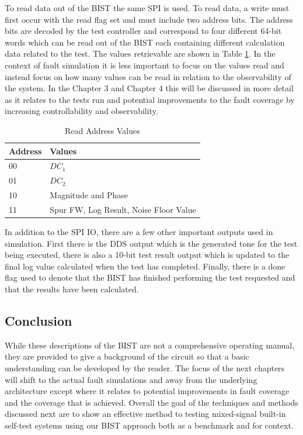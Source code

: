 \documentclass[12pt]{report}
\begin{document}
To read data out of the BIST the same SPI is used.  To read data, a write must first occur with the read flag set and must include two address bits.  The address bits are decoded by the test controller and correspond to four different 64-bit words which can be read out of the BIST each containing different calculation data related to the test.  The values retrievable are shown in Table \ref{tbl:readvals}.  In the context of fault simulation it is less important to focus on the values read and instead focus on how many values can be read in relation to the observability of the system.  In the Chapter 3 and Chapter 4 this will be discussed in more detail as it relates to the tests run and potential improvements to the fault coverage by increasing controllability and observability.  
\begin{table}
	\caption{Read Address Values}
	\begin{center}
		\begin{tabular}{|l|l|}
			\hline
			Address & Values \\ \hline
			00 & $DC_1$ \\ \hline
			01 & $DC_2$ \\ \hline
			10 & Magnitude and Phase \\ \hline
			11 & Spur FW, Log Result, Noise Floor Value \\ \hline			
		\end{tabular}
	\end{center}
	\label{tbl:readvals}
\end{table}

In addition to the SPI IO, there are a few other important outputs used in simulation.  First there is the DDS output which is the generated tone for the test being executed, there is also a 10-bit test result output which is updated to the final log value calculated when the test has completed.  Finally, there is a done flag used to denote that the BIST has finished performing the test requested and that the results have been calculated.  

\subsection{Conclusion}
While these descriptions of the BIST are not a comprehensive operating manual, they are provided to give a background of the circuit so that a basic understanding can be developed by the reader.  The focus of the next chapters will shift to the actual fault simulations and away from the underlying architecture except where it relates to potential improvements in fault coverage and the coverage that is achieved.  Overall the goal of the techniques and methods discussed next are to show an effective method to testing mixed-signal built-in self-test systems using our BIST approach both as a benchmark and for context.
\end{document}
